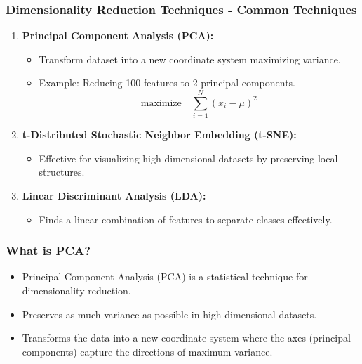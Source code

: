 \documentclass[aspectratio=169]{beamer}
\begin{document}
\begin{frame}[fragile]
    \frametitle{Dimensionality Reduction Techniques - Common Techniques}
    \begin{enumerate}
        \item \textbf{Principal Component Analysis (PCA):}
        \begin{itemize}
            \item Transform dataset into a new coordinate system maximizing variance.
            \item Example: Reducing 100 features to 2 principal components.
            \begin{equation}
                \text{maximize} \quad \sum_{i=1}^{N} (x_i - \mu)^2
            \end{equation}
        \end{itemize}
        
        \item \textbf{t-Distributed Stochastic Neighbor Embedding (t-SNE):}
        \begin{itemize}
            \item Effective for visualizing high-dimensional datasets by preserving local structures.
        \end{itemize}
        
        \item \textbf{Linear Discriminant Analysis (LDA):}
        \begin{itemize}
            \item Finds a linear combination of features to separate classes effectively.
        \end{itemize}
    \end{enumerate}
\end{frame}

\begin{frame}
    \titlepage
\end{frame}

\begin{frame}[fragile]
    \frametitle{What is PCA?}
    \begin{itemize}
        \item Principal Component Analysis (PCA) is a statistical technique for dimensionality reduction.
        \item Preserves as much variance as possible in high-dimensional datasets.
        \item Transforms the data into a new coordinate system where the axes (principal components) capture the directions of maximum variance.
    \end{itemize}
\end{frame}
\end{document}
